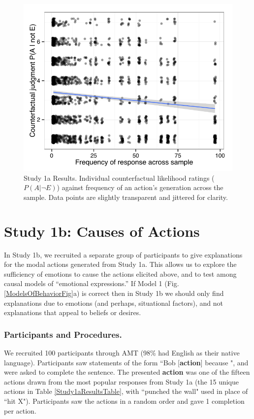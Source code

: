 \documentclass[10pt,letterpaper]{article}
\begin{document}
\begin{figure}[htb!]
\begin{center}
	\includegraphics[width=0.80\columnwidth]{images/study1a_results.pdf}
\end{center}
\caption{ Study 1a Results. Individual counterfactual likelihood ratings ($P(A | \neg E)$) against frequency of an action's generation across the sample. Data points are slightly transparent and jittered for clarity. }
\label{Study1aResultsFig}
\end{figure}


\section{Study 1b: Causes of Actions}

In Study 1b, we recruited a separate group of participants to give explanations for the modal actions generated from Study 1a. 
This allows us to explore the sufficiency of emotions to cause the actions elicited above, and to test among causal models of ``emotional expressions.''
If Model 1 (Fig. \ref{ModelsOfBehaviorFig}a) is correct then in Study 1b we should only find explanations due to emotions (and perhaps, situational factors), and not explanations that appeal to beliefs or desires.


\subsubsection{Participants and Procedures.} 
We recruited 100 participants through AMT (98\% had English as their native language). Participants saw statements of the form ``Bob [\textbf{action}] because \underline{\hspace{2em}}", and were asked to complete the sentence. The presented \textbf{action} was one of the fifteen actions drawn from the most popular responses from Study 1a (the 15 unique actions in Table \ref{Study1aResultsTable}, with ``punched the wall" used in place of ``hit X"). Participants saw the actions in a random order and gave 1 completion per action.
\end{document}
